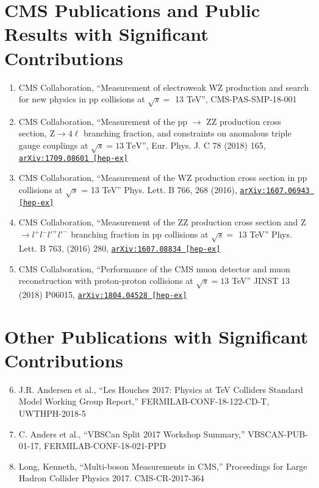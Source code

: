 \documentclass[10pt]{res} %
\begin{document}
\begin{resume}
\section{CMS Publications and Public Results with Significant Contributions}
\begin{enumerate}
  \item CMS Collaboration, ``Measurement of electroweak WZ production and search for new physics in pp collisions at $\sqrt{s} =$ 13 TeV'', CMS-PAS-SMP-18-001
  \item CMS Collaboration, ``Measurement of the pp $\rightarrow$ ZZ production cross section, $\mathrm{Z} \to 4\ell$ branching fraction, and constraints on anomalous triple gauge couplings at $\sqrt{s} = 13~\mathrm{TeV}$'', Eur. Phys. J. C 78 (2018) 165, \href{https://arxiv.org/abs/1709.08601}{\texttt{arXiv:1709.08601 [hep-ex]}}
  \item CMS Collaboration, ``Measurement of the WZ production cross section in pp collisions at $\sqrt{s}$ = 13 TeV''
Phys. Lett. B 766, 268 (2016), \href{https://arxiv.org/abs/1607.06943}{\texttt{arXiv:1607.06943 [hep-ex]}}
  \item CMS Collaboration, ``Measurement of the ZZ production cross section and Z $\rightarrow l^{+}l^{-}l'^{+}l'^{-}$ branching fraction in pp collisions at $\sqrt{s} =$ 13 TeV''
Phys. Lett. B 763, (2016) 280, \href{https://arxiv.org/abs/1607.08834} {\texttt{arXiv:1607.08834 [hep-ex]}}
  \item CMS Collaboration, ``Performance of the CMS muon detector and muon reconstruction with proton-proton collisions at $\sqrt{s} = 13$ TeV''
JINST 13 (2018) P06015, \href{https://arxiv.org/abs/1804.04528} {\texttt{arXiv:1804.04528 [hep-ex]}}
\end{enumerate}

\section{Other Publications with Significant Contributions}
\begin{enumerate}
  \setcounter{enumi}{5}
  \item J.R. Andersen et al., ``Les Houches 2017: Physics at TeV Colliders Standard Model Working Group Report,''
    FERMILAB-CONF-18-122-CD-T, UWTHPH-2018-5
  \item C. Anders et al., ``VBSCan Split 2017 Workshop Summary,'' 
    VBSCAN-PUB-01-17, FERMILAB-CONF-18-021-PPD
  \item Long, Kenneth, ``Multi-boson Measurements in CMS,''
    Proceedings for Large Hadron Collider Physics 2017. CMS-CR-2017-364
\end{enumerate}


\end{resume}
\end{document}
